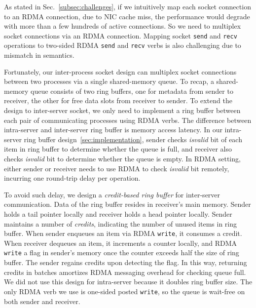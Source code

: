 As stated in Sec.~\ref{subsec:challenges}, if we intuitively map each socket connection to an RDMA connection, due to NIC cache miss, the performance would degrade with more than a few hundreds of active connections. So we need to multiplex socket connections via an RDMA connection. Mapping socket \texttt{send} and \texttt{recv} operations to two-sided RDMA \texttt{send} and \texttt{recv} verbs is also challenging due to mismatch in semantics.

Fortunately, our inter-process socket design can multiplex socket connections between two processes via a single shared-memory queue. To recap, a shared-memory queue consists of two ring buffers, one for metadata from sender to receiver, the other for free data slots from receiver to sender. To extend the design to inter-server socket, we only need to implement a ring buffer between each pair of communicating processes using RDMA verbs. The difference between intra-server and inter-server ring buffer is memory access latency. In our intra-server ring buffer design~\ref{sec:implementation}, sender checks \textit{isvalid} bit of each item in ring buffer to determine whether the queue is full, and receiver also checks \textit{isvalid} bit to determine whether the queue is empty. In RDMA setting, either sender or receiver needs to use RDMA to check \textit{isvalid} bit remotely, incurring one round-trip delay per operation.

To avoid such delay, we design a \textit{credit-based ring buffer} for inter-server communication. Data of the ring buffer resides in receiver's main memory. Sender holds a tail pointer locally and receiver holds a head pointer locally. Sender maintains a number of \textit{credits}, indicating the number of unused items in ring buffer. When sender enqueues an item via RDMA \texttt{write}, it consumes a credit. When receiver dequeues an item, it increments a counter locally, and RDMA \texttt{write} a flag in sender's memory once the counter exceeds half the size of ring buffer. The sender regains credits upon detecting the flag. In this way, returning credits in batches amortizes RDMA messaging overhead for checking queue full. We did not use this design for intra-server because it doubles ring buffer size. The only RDMA verb we use is one-sided posted \texttt{write}, so the queue is wait-free on both sender and receiver.

